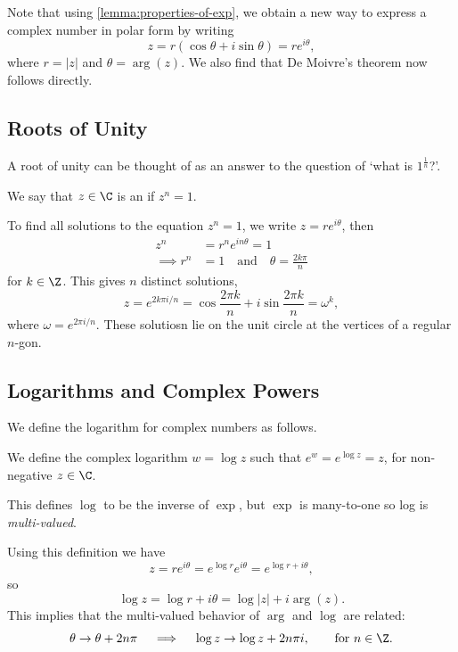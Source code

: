 \documentclass[a4]{scrartcl}
\begin{document}
Note that using \autoref{lemma:properties-of-exp}, we obtain a new way to express a complex number in polar form by writing
$$
z = r(\cos \theta + i \sin \theta) = re^{i \theta},
$$
where $r = |z|$ and $\theta = \arg(z)$. We also find that De Moivre's theorem now follows directly. 

\subsection{Roots of Unity}

A root of unity can be thought of as an answer to the question of `what is $1^{\frac{1}{n}}$?'.

\begin{definition}
	We say that $z \in \C$ is an  if $z^n = 1$.
\end{definition}

To find all solutions to the equation $z^n = 1$, we write $z = re^{i \theta}$, then
\begin{align*}
	z^n &= r^n e^{i n \theta} = 1 \\
	\implies r^n &= 1 \quad \text{and} \quad  \theta = \frac{2 k \pi}{n}
\end{align*}
for $k \in \Z$. This gives $n$ distinct solutions,
$$
z = e^{2 k\pi i/n} = \cos \frac{2\pi k}{n} + i \sin \frac{2 \pi k}{n} = \omega^k,
$$
where $\omega = e^{2 \pi i/n}$. These solutiosn lie on the unit circle at the vertices of a regular $n$-gon.

\subsection{Logarithms and Complex Powers}

We define the logarithm for complex numbers as follows.

\begin{definition}
	We define the complex logarithm $w = \log z$ such that $e^w = e^{\log z} = z$, for non-negative $z \in \C$.
\end{definition}

This defines $\log$ to be the inverse of $\exp$, but $\exp$ is many-to-one so log is \emph{multi-valued}.

Using this definition we have
$$
z = re^{i \theta} = e^{\log r} e^{i \theta} = e^{\log r + i \theta},
$$
so 
$$
\log z= \log r + i \theta = \log |z| + i \arg(z).
$$
This implies that the multi-valued behavior of $\arg$ and $\log$ are related:
$$
\theta \rightarrow \theta + 2n \pi  \quad \implies \quad \log z \rightarrow \log z + 2 n \pi i, \quad \quad \text{for } n \in \Z.
$$
\end{document}
